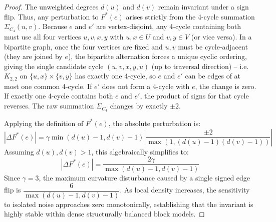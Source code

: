 \documentclass{siuro250211}
\theoremstyle{remark}
\theoremstyle{plain}
\begin{document}
\begin{proof}
The unweighted degrees $d(u)$ and $d(v)$ remain invariant under a sign flip. Thus, any perturbation to $F^*(e)$ arises strictly from the 4-cycle summation $\Sigma_{C_4}(u,v)$. Because $e$ and $e'$ are vertex-disjoint, any 4-cycle containing both must use all four vertices $u,v,x,y$ with $u,x \in U$ and $v,y \in V$ (or vice versa). In a bipartite graph, once the four vertices are fixed and $u,v$ must be cycle-adjacent (they are joined by $e$), the bipartite alternation forces a unique cyclic ordering, giving the single candidate cycle $(u,v,x,y,u)$ (up to traversal direction) -- i.e.\ $K_{2,2}$ on $\{u,x\}\times\{v,y\}$ has exactly one 4-cycle, so $e$ and $e'$ can be edges of at most one common 4-cycle. If $e'$ does not form a 4-cycle with $e$, the change is zero. If exactly one 4-cycle contains both $e$ and $e'$, the product of signs for that cycle reverses. The raw summation $\Sigma_{C_4}$ changes by exactly $\pm 2$.

Applying the definition of $F^*(e)$, the absolute perturbation is:
\begin{equation}
|\Delta F^*(e)| = \gamma \min(d(u)-1, d(v)-1) \left| \frac{\pm 2}{\max(1, (d(u)-1)(d(v)-1))} \right|
\end{equation}
Assuming $d(u), d(v) > 1$, this algebraically simplifies to:
\begin{equation}
|\Delta F^*(e)| = \frac{2\gamma}{\max(d(u)-1, d(v)-1)}
\end{equation}
Since $\gamma = 3$, the maximum curvature disturbance caused by a single signed edge flip is $\dfrac{6}{\max(d(u)-1, d(v)-1)}$. As local density increases, the sensitivity to isolated noise approaches zero monotonically, establishing that the invariant is highly stable within dense structurally balanced block models.
\end{proof}
\end{document}
